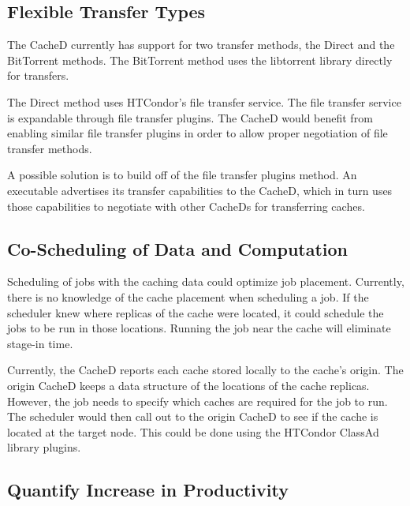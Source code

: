 \subsection{Flexible Transfer Types}

The CacheD currently has support for two transfer methods, the Direct and the BitTorrent methods.  The BitTorrent method uses the libtorrent library directly for transfers.

The Direct method uses HTCondor's file transfer service.  The file transfer service is expandable through file transfer plugins.  The CacheD would benefit from enabling similar file transfer plugins in order to allow proper negotiation of file transfer methods.

A possible solution is to build off of the file transfer plugins method.  An executable advertises its transfer capabilities to the CacheD, which in turn uses those capabilities to negotiate with other CacheDs for transferring caches.


\subsection{Co-Scheduling of Data and Computation}

Scheduling of jobs with the caching data could optimize job placement.  Currently, there is no knowledge of the cache placement when scheduling a job.  If the scheduler knew where replicas of the cache were located, it could schedule the jobs to be run in those locations.  Running the job near the cache will eliminate stage-in time.

Currently, the CacheD reports each cache stored locally to the cache's origin. The origin CacheD keeps a data structure of the locations of the cache replicas.  However, the job needs to specify which caches are required for the job to run.  The scheduler would then call out to the origin CacheD to see if the cache is located at the target node.  This could be done using the HTCondor ClassAd library plugins.


\subsection{Quantify Increase in Productivity}

